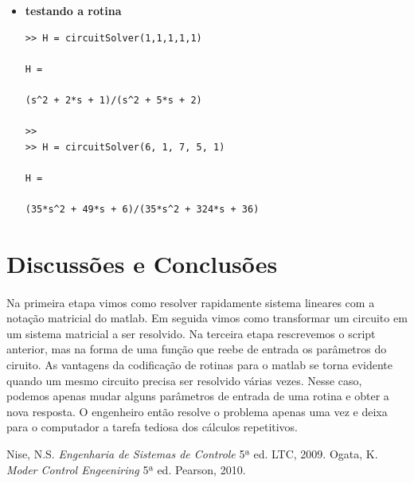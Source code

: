 \documentclass[a4paper,11pt]{article}
\begin{document}
\begin{itemize}
\item \textbf{testando a rotina}
\begin{lstlisting}[frame=single]
>> H = circuitSolver(1,1,1,1,1)
 
H =
 
(s^2 + 2*s + 1)/(s^2 + 5*s + 2)
 
>> 
>> H = circuitSolver(6, 1, 7, 5, 1)
 
H =
 
(35*s^2 + 49*s + 6)/(35*s^2 + 324*s + 36)
\end{lstlisting}

\end{itemize}
 \newpage
\section{Discussões e Conclusões}
\paragraph{} 
Na primeira etapa vimos como resolver rapidamente sistema lineares
com a notação matricial do matlab. Em seguida vimos como transformar
um circuito em um sistema matricial a ser resolvido.
Na terceira etapa rescrevemos o script anterior, mas na forma de 
uma função que reebe de entrada os parâmetros do ciruito.
As vantagens da codificação de rotinas para o matlab se torna
evidente quando um mesmo circuito precisa ser resolvido várias vezes.
Nesse caso, podemos apenas mudar alguns parâmetros de entrada 
de uma rotina e obter a nova resposta. O engenheiro então resolve 
o problema apenas uma vez e deixa para o computador a tarefa tediosa
dos cálculos repetitivos. 
\begin{thebibliography}{9}    
  		Nise, N.S.
  		\emph{Engenharia de Sistemas de Controle}
 		 5ª ed.
		LTC, 2009.
  		Ogata, K.
  		\emph{Moder Control Engeeniring}
 		 5ª ed.
		Pearson, 2010.
 		 
\end{thebibliography}
\end{document}
